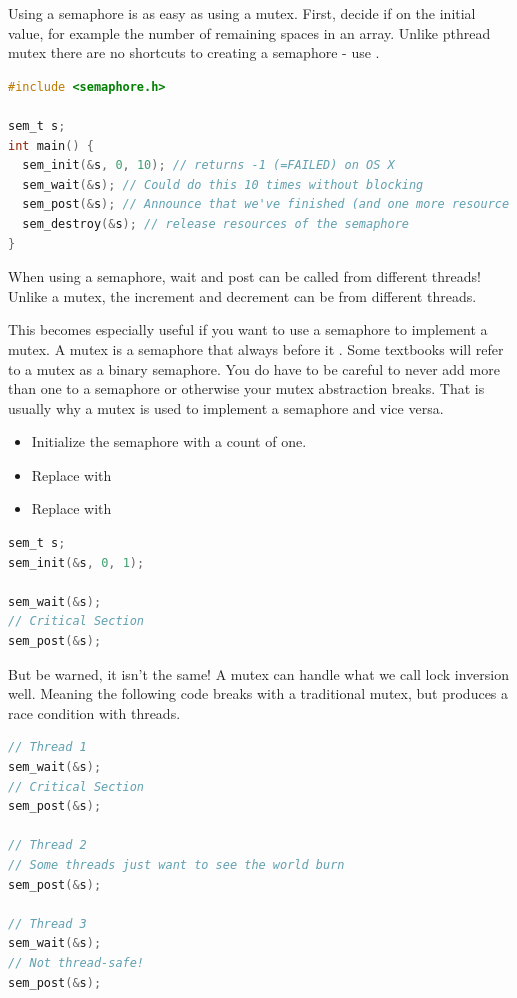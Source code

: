 Using a semaphore is as easy as using a mutex.
First, decide if on the initial value, for example the number of remaining spaces in an array.
Unlike pthread mutex there are no shortcuts to creating a semaphore - use .

\begin{lstlisting}[language=C]
#include <semaphore.h>

sem_t s;
int main() {
  sem_init(&s, 0, 10); // returns -1 (=FAILED) on OS X
  sem_wait(&s); // Could do this 10 times without blocking
  sem_post(&s); // Announce that we've finished (and one more resource item is available; increment count)
  sem_destroy(&s); // release resources of the semaphore
}
\end{lstlisting}

When using a semaphore, wait and post can be called from different threads!
Unlike a mutex, the increment and decrement can be from different threads.

This becomes especially useful if you want to use a semaphore to implement a mutex.
A mutex is a semaphore that always  before it .
Some textbooks will refer to a mutex as a binary semaphore.
You do have to be careful to never add more than one to a semaphore or otherwise your mutex abstraction breaks.
That is usually why a mutex is used to implement a semaphore and vice versa.

\begin{itemize}
\item Initialize the semaphore with a count of one.
\item Replace  with 
\item Replace  with 
\end{itemize}

\begin{lstlisting}[language=C]
sem_t s;
sem_init(&s, 0, 1);

sem_wait(&s);
// Critical Section
sem_post(&s);
\end{lstlisting}

But be warned, it isn't the same!
A mutex can handle what we call lock inversion well.
Meaning the following code breaks with a traditional mutex, but produces a race condition with threads.

\begin{lstlisting}[language=C]
// Thread 1
sem_wait(&s);
// Critical Section
sem_post(&s);

// Thread 2
// Some threads just want to see the world burn
sem_post(&s);

// Thread 3
sem_wait(&s);
// Not thread-safe!
sem_post(&s);
\end{lstlisting}


